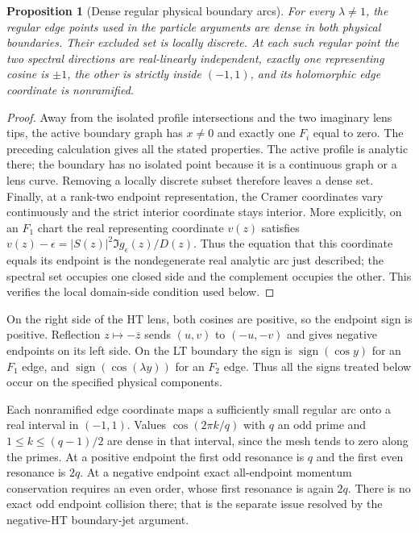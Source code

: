 \documentclass[11pt]{article}
\numberwithin{equation}{section}
\newtheorem{proposition}[theorem]{Proposition}
\theoremstyle{definition}
\begin{document}
\begin{proposition}[Dense regular physical boundary arcs]
\label{prop:regular_dense}
For every $\lambda\ne1$, the regular edge points used in the
particle arguments are dense in both physical boundaries.
Their excluded set is locally discrete.  At each such regular
point the two spectral directions are real-linearly independent,
exactly one representing cosine is $\pm1$, the other is strictly
inside $(-1,1)$, and its holomorphic edge coordinate is nonramified.
\end{proposition}
\begin{proof}
Away from the isolated profile intersections and the two imaginary
lens tips, the active boundary graph has $x\ne0$ and exactly one
$F_i$ equal to zero.  The preceding calculation gives all the stated
properties.  The active profile is analytic there; the boundary
has no isolated point because it is a continuous graph or a lens
curve.  Removing a locally discrete subset therefore leaves a dense
set.  Finally, at a rank-two endpoint representation, the Cramer
coordinates vary continuously and the strict interior coordinate
stays interior.  More explicitly, on an $F_1$ chart the real
representing coordinate $v(z)$ satisfies
$v(z)-\epsilon=|S(z)|^2\Im g_\epsilon(z)/D(z)$.
Thus the equation that this coordinate equals its endpoint is the
nondegenerate real analytic arc just described;
the spectral set occupies one closed side and the complement
occupies the other.  This verifies the local domain-side condition
used below.
\end{proof}

On the right side of the HT lens, both cosines are positive, so
the endpoint sign is positive.  Reflection $z\mapsto-\overline z$
sends $(u,v)$ to $(-u,-v)$ and gives negative endpoints on its left
side.  On the LT boundary the sign is $\operatorname{sign}(\cos y)$
for an $F_1$ edge, and $\operatorname{sign}(\cos(\lambda y))$ for
an $F_2$ edge.  Thus all the signs treated below occur on the
specified physical components.

Each nonramified edge coordinate maps a sufficiently small regular
arc onto a real interval in $(-1,1)$.  Values
$\cos(2\pi k/q)$ with $q$ an odd prime and
$1\le k\le(q-1)/2$ are dense in that interval, since the mesh
tends to zero along the primes.  At a positive endpoint the first
odd resonance is $q$ and the first even resonance is $2q$.
At a negative endpoint exact all-endpoint momentum conservation
requires an even order, whose first resonance is again $2q$.
There is no exact odd endpoint collision there; that is the
separate issue resolved by the negative-HT boundary-jet argument.
\end{document}
